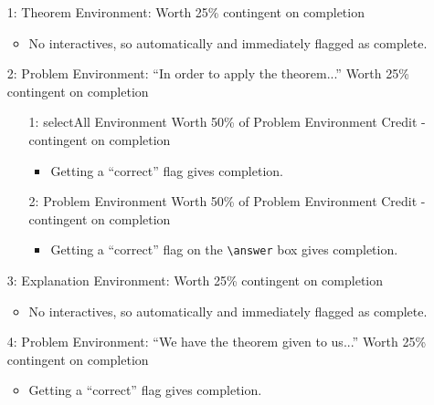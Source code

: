 \documentclass{ximera}
\begin{document}
        \begin{enumerate}
            \item[1:] Theorem Environment: Worth 25\% contingent on completion
                \begin{itemize}
                    \item No interactives, so automatically and immediately flagged as complete.
                \end{itemize}
            \item[2:] Problem Environment: ``In order to apply the theorem...'' Worth 25\% contingent on completion
                \begin{enumerate}
                    \item[1:] selectAll Environment Worth 50\% of Problem Environment Credit - contingent on completion
                        \begin{itemize}
                            \item Getting a ``correct'' flag gives completion.
                        \end{itemize}
                    
                    \item[2:] Problem Environment Worth 50\% of Problem Environment Credit - contingent on completion
                        \begin{itemize}
                            \item Getting a ``correct'' flag on the \verb|\answer| box gives completion.
                        \end{itemize}
                \end{enumerate}
            
            \item[3:] Explanation Environment: Worth 25\% contingent on completion
                \begin{itemize}
                    \item No interactives, so automatically and immediately flagged as complete.
                \end{itemize}
            
            \item[4:] Problem Environment: ``We have the theorem given to us...'' Worth 25\% contingent on completion
                \begin{itemize}
                    \item Getting a ``correct'' flag gives completion.
                \end{itemize}

        \end{enumerate}
        
\end{document}
